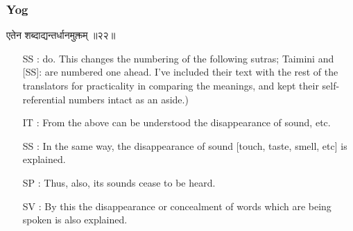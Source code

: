 \begin{frame}[fragile]\frametitle{Yog}
\begin{sanskrit}
एतेन शब्दाद्यन्तर्धानमुक्तम् ॥२२॥
\end{sanskrit}

	\begin{itemize}
	\item [SS]: do. This changes the numbering of the following sutras; Taimini and [SS]: are numbered one ahead. I’ve included their text with the rest of the translators for practicality in comparing the meanings, and kept their self-referential numbers intact as an aside.)
	\item [IT]: From the above can be understood the disappearance of sound, etc.
	\item [SS]: In the same way, the disappearance of sound [touch, taste, smell, etc] is explained.
	\item [SP]: Thus, also, its sounds cease to be heard.
	\item [SV]: By this the disappearance or concealment of words which are being spoken is also explained.
	\end{itemize}
\end{frame}

